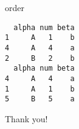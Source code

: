 \documentclass[ignorenonframetext,]{beamer}
\newenvironment{Shaded}{\begin{snugshade}}{\end{snugshade}}
\newcommand{\DataTypeTok}[1]{\textcolor[rgb]{0.13,0.29,0.53}{#1}}
\newcommand{\DecValTok}[1]{\textcolor[rgb]{0.00,0.00,0.81}{#1}}
\newcommand{\KeywordTok}[1]{\textcolor[rgb]{0.13,0.29,0.53}{\textbf{#1}}}
\newcommand{\NormalTok}[1]{#1}
\newcommand{\OperatorTok}[1]{\textcolor[rgb]{0.81,0.36,0.00}{\textbf{#1}}}
\newcommand{\StringTok}[1]{\textcolor[rgb]{0.31,0.60,0.02}{#1}}
\begin{document}
\begin{frame}[fragile]{order}
\protect\hypertarget{order}{}

\begin{Shaded}
\end{Shaded}

\begin{verbatim}
  alpha num beta
1     A   1    b
4     A   4    a
2     B   2    b
  alpha num beta
4     A   4    a
1     A   1    b
5     B   5    a
\end{verbatim}

\end{frame}

\begin{frame}

Thank you!

\end{frame}
\end{document}
